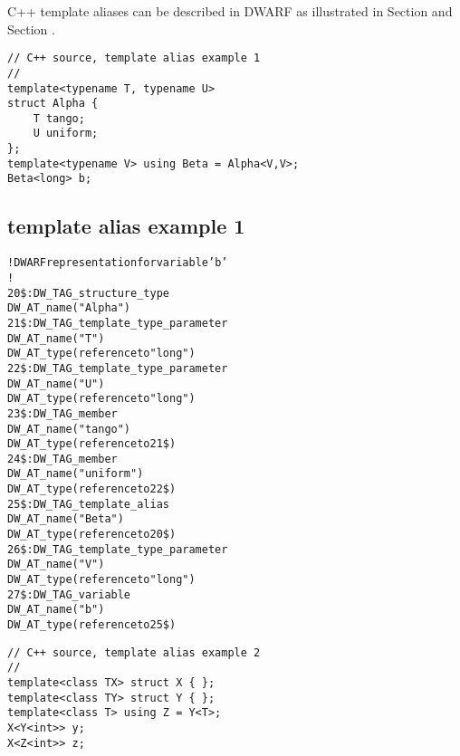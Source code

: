 C++ template aliases can be described in DWARF as illustrated in 
Section 
and 
Section .


\begin{lstlisting}
// C++ source, template alias example 1
//
template<typename T, typename U>
struct Alpha {
    T tango;
    U uniform;
};
template<typename V> using Beta = Alpha<V,V>;
Beta<long> b;
\end{lstlisting}


\subsection{template alias example 1}
\label{app:templatealiasexample1}
\begin{alltt}
! DWARF representation for variable 'b'
!
20\$: DW\_TAG\_structure\_type
        DW\_AT\_name("Alpha")
21\$:   DW\_TAG\_template\_type\_parameter
            DW\_AT\_name("T")
            DW\_AT\_type(reference to "long")
22\$:   DW\_TAG\_template\_type\_parameter
            DW\_AT\_name("U")
            DW\_AT\_type(reference to "long")
23\$:   DW\_TAG\_member
            DW\_AT\_name("tango")
            DW\_AT\_type(reference to 21\$)
24\$:   DW\_TAG\_member
            DW\_AT\_name("uniform")
            DW\_AT\_type(reference to 22\$)
25\$: DW\_TAG\_template\_alias
        DW\_AT\_name("Beta")
        DW\_AT\_type(reference to 20\$)
26\$:   DW\_TAG\_template\_type\_parameter
            DW\_AT\_name("V")
            DW\_AT\_type(reference to "long")
27\$: DW\_TAG\_variable
        DW\_AT\_name("b")
        DW\_AT\_type(reference to 25\$)
\end{alltt}


\begin{lstlisting}
// C++ source, template alias example 2
//
template<class TX> struct X { };
template<class TY> struct Y { };
template<class T> using Z = Y<T>;
X<Y<int>> y;
X<Z<int>> z;
\end{lstlisting}


